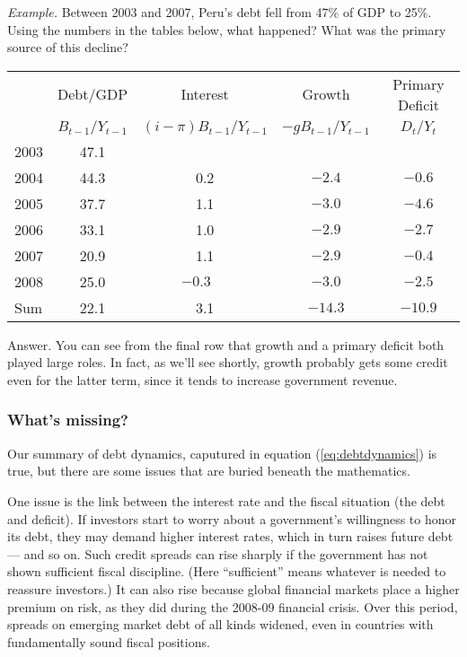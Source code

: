 \documentclass[letterpaper,12pt]{article}
\begin{document}
{\it Example.\/}  Between 2003 and 2007,
Peru's debt fell from 47\% of GDP to 25\%.
Using the numbers in the tables below, what happened?
What was the primary source of this decline?

\begin{center}
\begin{tabular}{lcccc}
\toprule
        & Debt/GDP   & Interest &  Growth & Primary Deficit \\
        &  $B_{t-1}/Y_{t-1}$ &  $(i-\pi)B_{t-1}/Y_{t-1}$  &  $-g B_{t-1}/Y_{t-1}$
                & $D_t/Y_t$ \\
\midrule
2003 \hspace*{0.4in}
            & 47.1 &  \\
2004        & 44.3 & 0.2 & $-2.4$ & $-0.6$  \\
2005        & 37.7 & 1.1 & $-3.0$ & $-4.6$  \\
2006        & 33.1 & 1.0 & $-2.9$ & $-2.7$  \\
2007        & 20.9 & 1.1 & $-2.9$ & $-0.4$  \\
2008        & 25.0 & $-0.3\phantom{-}$ & $-3.0$ & $-2.5$ \\
\midrule
Sum         & 22.1 & 3.1 & $-14.3$ & $-10.9$ \\
\bottomrule
\end{tabular}
\end{center}

Answer.  You can see from the final row that
growth and a primary deficit both played large roles.
In fact, as we'll see shortly,
growth probably gets some credit even for the latter term,
since it tends to increase government revenue.


\subsubsection*{What's missing?}

Our summary of debt dynamics,
caputured in equation (\ref{eq:debtdynamics}) is true,
but there are some
issues that are buried beneath the mathematics.

One issue is the link between the interest rate
and the fiscal situation (the debt and deficit).
If investors start to worry about a government's
willingness to honor its debt,
they may demand higher interest rates,
which in turn raises future debt --- and so on.
Such credit spreads can rise sharply
if the government has not shown sufficient
fiscal discipline.
(Here ``sufficient'' means whatever is needed to reassure
investors.)
It can also rise because global financial markets
place a higher premium on risk,
as they did during the 2008-09 financial crisis.
Over this period, spreads on emerging market debt of all kinds
widened, even in countries with fundamentally sound
fiscal positions.
\end{document}

